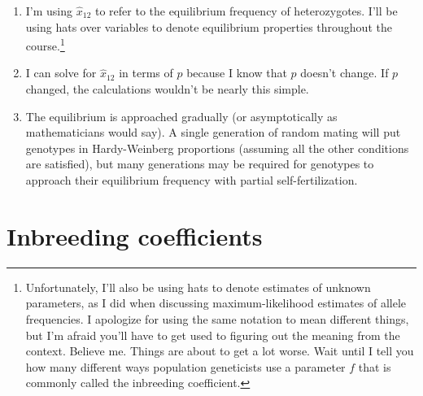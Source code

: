 \begin{enumerate}

\item I'm using $\hat x_{12}$ to refer to the equilibrium frequency of
  heterozygotes. I'll be using hats over variables to denote
  equilibrium properties throughout the
  course.\footnote{Unfortunately, I'll also be using hats to denote
    estimates of unknown parameters, as I did when discussing
    maximum-likelihood estimates of allele frequencies. I apologize
    for using the same notation to mean different things, but I'm
    afraid you'll have to get used to figuring out the meaning from
    the context. Believe me. Things are about to get a lot worse. Wait
    until I tell you how many different ways population geneticists
    use a parameter $f$ that is commonly called the inbreeding
    coefficient.}

\item I can solve for $\hat x_{12}$ in terms of $p$ because I know
  that $p$ doesn't change. If $p$ changed, the calculations wouldn't
  be nearly this simple.

\item The equilibrium is approached gradually (or asymptotically as
  mathematicians would say). A single generation of random mating will
  put genotypes in Hardy-Weinberg proportions (assuming all the other
  conditions are satisfied), but many generations may be required for
  genotypes to approach their equilibrium frequency with partial
  self-fertilization.

\end{enumerate}

\section*{Inbreeding coefficients}

